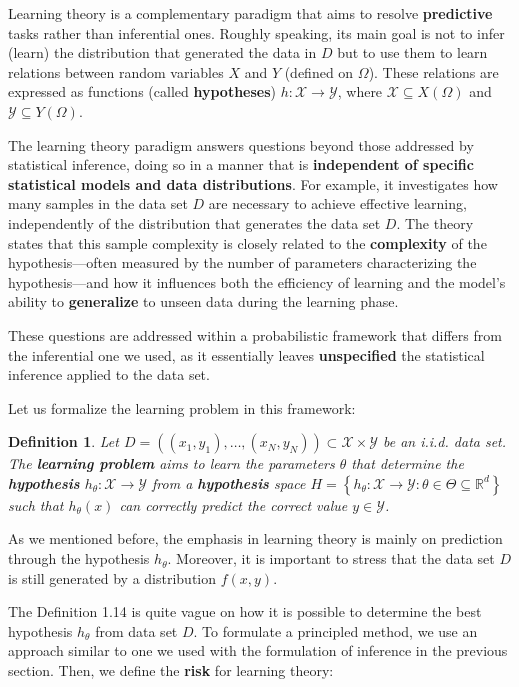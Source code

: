 \documentclass{report}
\newtheorem{definition}{Definition}[chapter]
\begin{document}
Learning theory is a complementary paradigm that aims to resolve \textbf{predictive} tasks rather than inferential ones. Roughly speaking, its main goal is not to infer (learn) the distribution that generated the data in $D$ but to use them to learn relations between random variables $X$ and $Y$ (defined on $\Omega$). These relations are expressed as functions (called \textbf{hypotheses}) $h : \mathcal{X} \to \mathcal{Y}$, where $\mathcal{X} \subseteq X(\Omega)$ and $\mathcal{Y} \subseteq Y(\Omega)$.

The learning theory paradigm answers questions beyond those addressed by statistical inference, doing so in a manner that is \textbf{independent of specific statistical models and data distributions}. For example, it investigates how many samples in the data set $D$ are necessary to achieve effective learning, independently of the distribution that generates the data set $D$. The theory states that this sample complexity is closely related to the \textbf{complexity} of the hypothesis—often measured by the number of parameters characterizing the hypothesis—and how it influences both the efficiency of learning and the model’s ability to \textbf{generalize} to unseen data during the learning phase.

These questions are addressed within a probabilistic framework that differs from the inferential one we used, as it essentially leaves \textbf{unspecified} the statistical inference applied to the data set.

Let us formalize the learning problem in this framework:
\begin{definition}
Let $D = ((x_1,y_1),\dots,(x_N,y_N)) \subset \mathcal{X}\times \mathcal{Y}$ be an i.i.d. data set. The \textbf{learning problem} aims to learn the parameters $\theta$ that determine the \textbf{hypothesis} $h_\theta : \mathcal{X}\to \mathcal{Y}$ from a \textbf{hypothesis} space $H = \left\{h_\theta : \mathcal{X}\to \mathcal{Y} : \theta \in \Theta \subseteq \mathbb{R}^d\right\}$ such that $h_\theta(x)$ can correctly predict the correct value $y \in \mathcal{Y}$.
\end{definition}

As we mentioned before, the emphasis in learning theory is mainly on prediction through the hypothesis $h_\theta$. Moreover, it is important to stress that the data set $D$ is still generated by a distribution $f(x,y)$.

The Definition 1.14 is quite vague on how it is possible to determine the best hypothesis $h_\theta$ from data set $D$. To formulate a principled method, we use an approach similar to one we used with the formulation of inference in the previous section. Then, we define the \textbf{risk} for learning theory:
\end{document}
